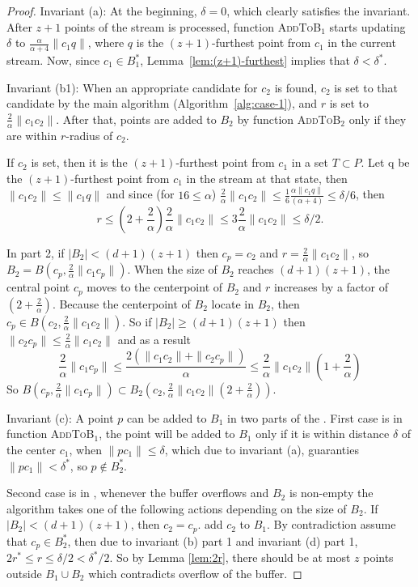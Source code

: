 \documentclass[envcountsame]{cls/cccg15}
\newcommand{\rc}{r}
\newcommand{\cp}{c_p}
\newcommand{\dz}{(d + 1)(z + 1)}
\newcommand{\textproc}{\textsc}
\newcommand{\len}[1]{\|{#1}\|}
\newcommand{\radius}[1]{\frac{2}{\alpha} \len{c_1 #1}}
\newcommand{\lee}{\leqslant}
\newcommand{\gee}{\geqslant}
\renewcommand{\leq}{\lee}
\renewcommand{\ge}{\gee}
\begin{document}
\begin{proof} 
Invariant (a): 
At the beginning, $\delta = 0$, which clearly satisfies the invariant.
After $z+1$ points of the stream is processed, 
function \textproc{AddToB$_1$} starts updating $\delta$
to $\frac{\alpha}{\alpha+4}\len{c_1q}$,
where $q$ is the $(z+1)$-furthest point from $c_1$ in the current stream.
Now, since $c_1 \in B_1^*$, Lemma~\ref{lem:(z+1)-furthest}
implies that $\delta < \delta^*$.

Invariant (b1): 
When an appropriate candidate for $c_2$ is found, 
$c_2$ is set to that candidate by the main algorithm (Algorithm~\ref{alg:case-1}),
and $\rc$ is set to $\frac{2}{\alpha}\len{c_1c_2}$.
After that, points are added to $B_2$ by function \textproc{AddToB$_2$}
only if they are within $\rc$-radius of $c_2$. 

If $c_2$ is set, then it is the $(z+1)$-furthest point from $c_1$ in a set $T \subset P$.
Let q be the $(z+1)$-furthest point from $c_1$ in the stream at that state, then $\len{c_1c_2} \leq \len{c_1q}$ and since (for $16 \leq \alpha$) $\radius{c_2} \leq \frac{1}{6}\frac{\alpha \len{c_1 q}}{(\alpha + 4)} \leq \delta / 6$, then 
$$r \leq (2 + \frac{2}{\alpha})\radius{c_2} \leq 3 \radius{c_2}  \leq \delta /2.$$

In part 2, if $|B_2| < \dz$ then $c_p = c_2$ and $r = \radius{c_2}$, so $B_2 = B(c_p, \radius{c_p})$. 
When the size of $B_2$ reaches $\dz$, the central point $\cp$ moves to the centerpoint of $B_2$ and $\rc$ increases by a factor of $(2 + \frac{2}{\alpha})$. 
Because the centerpoint of $B_2$ locate in $B_2$, then $c_p \in B(c_2, \radius{c_2})$.
So if $|B_2| \ge \dz$ then $\len{c_2 c_p} \leq \radius{c_2}$ and as a result
$$\radius{c_p} \leq \frac{2 (\len{c_1 c_2} + \len{c_2 c_p})}{\alpha} \leq \radius{c_2}(1 + \frac{2}{\alpha})$$ 
So $B(c_p, \radius{c_p}) \subset B_2(c_2, \radius{c_2}(2 + \frac{2}{\alpha}))$.

Invariant (c): A point $p$ can be added to $B_1$ in two parts of the . 
First case is in function \textproc{AddToB$_1$}, the point will be added to $B_1$ only if it is within distance $\delta$ of the center $c_1$,  when $\len{pc_1} \leq \delta$, which due to invariant (a), guaranties $\len{pc_1} < \delta^*$, so $p \not \in B_2^*$.

Second case is in , whenever the buffer overflows and $B_2$ is non-empty the algorithm takes one of the following actions depending on the size of $B_2$.
If $|B_2| < \dz $, then $c_2 = c_p$.  add $c_2$ to $B_1$.
By contradiction assume that $c_p \in B_2^*$, then due to invariant (b) part 1 and invariant (d) part 1, $2r^* \leq r \leq \delta/2 < \delta^*/2$. So by Lemma \ref{lem:2r}, there should be at most $z$ points outside $B_1 \cup B_2$ which contradicts overflow of the buffer. 


\end{proof}
\end{document}
